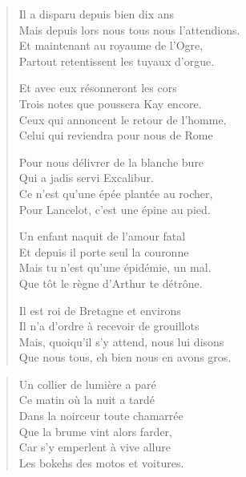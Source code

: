 \begin{verse}%
  \quatrain%
  Il a disparu depuis bien dix ans\\  %
  Mais depuis lors nous tous nous l’attendions.\\  %
  Et maintenant au royaume de l’Ogre,\\  %
  Partout retentissent les tuyaux d’orgue.

  Et avec eux résonneront les cors\\  %
  Trois notes que poussera Kay encore.\\  %
  Ceux qui annoncent le retour de l’homme,\\  %
  Celui qui reviendra pour nous de Rome

  Pour nous délivrer de la blanche bure\\  %
  Qui a jadis servi Excalibur.\\  %
  Ce n’est qu’une épée plantée au rocher,\\  %
  Pour Lancelot, c’est une épine au pied.

  Un enfant naquit de l’amour fatal\\  %
  Et depuis il porte seul la couronne\\  %
  Mais tu n’est qu’une épidémie, un mal.\\  %
  Que tôt le règne d’Arthur te détrône.

  Il est roi de Bretagne et environs\\  %
  Il n’a d’ordre à recevoir de grouillots\\  %
  Mais, quoiqu’il s’y attend, nous lui disons\\  %
  Que nous tous, eh bien nous en avons gros.
\end{verse}

\begin{verse}%
  \sizain%
  Un collier de lumière a paré\\  %
  Ce matin où la nuit a tardé\\  %
  Dans la noirceur toute chamarrée\\  %
  Que la brume vint alors farder,\\  %
  Car s’y emperlent à vive allure\\  %
  Les bokehs des motos et voitures.
\end{verse}

